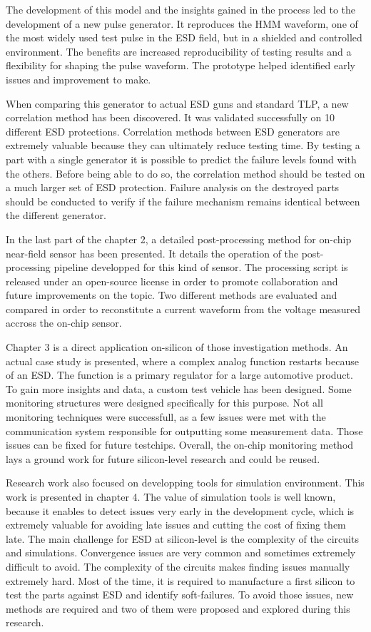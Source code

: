 The development of this model and the insights gained in the process led to the development of a new pulse generator.
It reproduces the HMM waveform, one of the most widely used test pulse in the ESD field, but in a shielded and controlled environment.
The benefits are increased reproducibility of testing results and a flexibility for shaping the pulse waveform.
The prototype helped identified early issues and improvement to make.

When comparing this generator to actual ESD guns and standard TLP, a new correlation method has been discovered.
It was validated successfully on 10 different ESD protections.
Correlation methods between ESD generators are extremely valuable because they can ultimately reduce testing time.
By testing a part with a single generator it is possible to predict the failure levels found with the others.
Before being able to do so, the correlation method should be tested on a much larger set of ESD protection.
Failure analysis on the destroyed parts should be conducted to verify if the failure mechanism remains identical between the different generator.

In the last part of the chapter 2, a detailed post-processing method for on-chip near-field sensor has been presented.
It details the operation of the post-processing pipeline developped for this kind of sensor.
The processing script is released \cite{} under an open-source license in order to promote collaboration and future improvements on the topic.
Two different methods are evaluated and compared in order to reconstitute a current waveform from the voltage measured accross the on-chip sensor.

Chapter 3 is a direct application on-silicon of those investigation methods.
An actual case study is presented, where a complex analog function restarts because of an ESD.
The function is a primary regulator for a large automotive product.
To gain more insights and data, a custom test vehicle has been designed.
Some monitoring structures were designed specifically for this purpose.
Not all monitoring techniques were successfull, as a few issues were met with the communication system responsible for outputting some measurement data.
Those issues can be fixed for future testchips.
Overall, the on-chip monitoring method lays a ground work for future silicon-level research and could be reused.

Research work also focused on developping tools for simulation environment.
This work is presented in chapter 4.
The value of simulation tools is well known, because it enables to detect issues very early in the development cycle, which is extremely valuable for avoiding late issues and cutting the cost of fixing them late.
The main challenge for ESD at silicon-level is the complexity of the circuits and simulations.
Convergence issues are very common and sometimes extremely difficult to avoid.
The complexity of the circuits makes finding issues manually extremely hard.
Most of the time, it is required to manufacture a first silicon to test the parts against ESD and identify soft-failures.
To avoid those issues, new methods are required and two of them were proposed and explored during this research.

